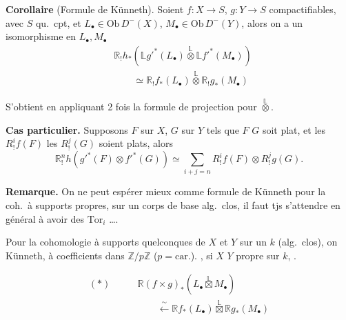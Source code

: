 \documentclass[11pt,a4paper]{article}
\begin{document}
\textbf{Corollaire} (Formule de Künneth). Soient $f : X \to S$, $g : Y \to S$ compactifiables, avec $S$ qu.\ cpt, et $L_{\bullet} \in \mathrm{Ob}\, D^{-}(X)$, $M_{\bullet} \in \mathrm{Ob}\, D^{-}(Y)$, alors on a un isomorphisme  en $L_{\bullet}, M_{\bullet}$
\begin{align*}
  &\mathbb{R}_{!}h_{*}(\mathbb{L}g'^{*}(L_{\bullet}) \overset{\mathbb{L}}{\otimes} \mathbb{L}f'^{*}(M_{\bullet})) \\
  &\qquad \simeq \mathbb{R}_{!}f_{*}(L_{\bullet}) \overset{\mathbb{L}}{\otimes} \mathbb{R}_{!}g_{*}(M_{\bullet})
\end{align*}



S'obtient en appliquant 2 fois la formule de projection pour $\overset{\mathbb{L}}{\otimes}$.

\textbf{Cas particulier.} Supposons $F$ sur $X$, $G$ sur $Y$ tels que  \struck{\ill{} \ill{}} $F$  $G$ soit plat, et les $R^{i}_{!}f(F)$  les $R^{j}_{!}(G)$ soient plats, alors
\[
  \mathbb{R}^{n}_{!}h(g'^{*}(F) \otimes f'^{*}(G))
  \simeq \sum_{i+j=n} R^{i}_{!}f(F) \otimes R^{j}_{!}g(G) .
\]

\textbf{Remarque.} On ne peut espérer mieux comme formule de Künneth pour la coh.\ à supports propres,  sur un corps de base alg.\ clos,  il faut tjs s'attendre en général à avoir des $\mathrm{Tor}_i$ ….

Pour la cohomologie à supports quelconques de $X$ et $Y$  sur un $k$ (alg.\ clos), on \ill{} \ill{} Künneth, à coefficients dans $\mathbb{Z}/p\mathbb{Z}$   ($p = \text{car.}$). , si $X$ \ill{} $Y$ propre sur $k$, \ill{} \ill{} \ill{}.

\begin{align*}
  (*) \qquad &\mathbb{R}(f \times g)_{*}(L_{\bullet} \overset{\mathbb{L}}{\boxtimes} M_{\bullet}) \\
  &\qquad \xleftarrow{\ \sim\ } \mathbb{R}f_{*}(L_{\bullet}) \overset{\mathbb{L}}{\boxtimes} \mathbb{R}g_{*}(M_{\bullet})
\end{align*}
\end{document}
